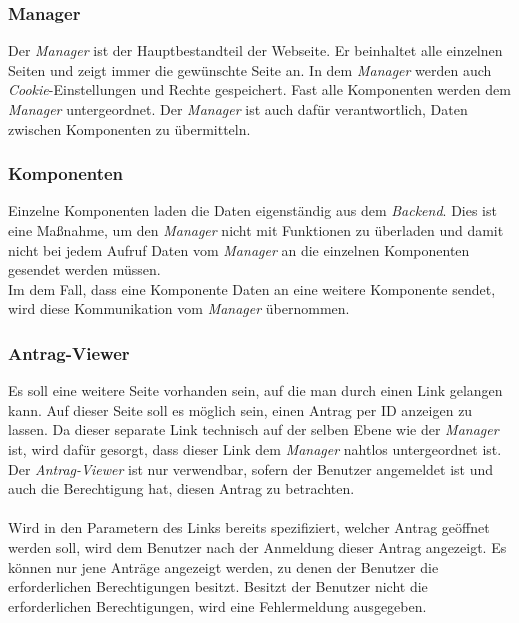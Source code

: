 \subsubsection{Manager}
Der \textit{Manager} ist der Hauptbestandteil der Webseite. Er beinhaltet alle einzelnen Seiten und zeigt immer die gewünschte Seite an. In dem \textit{Manager} werden auch \textit{Cookie}-Einstellungen und Rechte gespeichert. Fast alle Komponenten werden dem \textit{Manager} untergeordnet. Der \textit{Manager} ist auch dafür verantwortlich, Daten zwischen Komponenten zu übermitteln.

\subsubsection{Komponenten}
Einzelne Komponenten laden die Daten eigenständig aus dem \textit{Backend}. Dies ist eine Maßnahme, um den \textit{Manager} nicht mit Funktionen zu überladen und damit nicht bei jedem Aufruf Daten vom \textit{Manager} an die einzelnen Komponenten gesendet werden müssen.\\
Im dem Fall, dass eine Komponente Daten an eine weitere Komponente sendet, wird diese Kommunikation vom \textit{Manager} übernommen.

\subsubsection{Antrag-Viewer}
Es soll eine weitere Seite vorhanden sein, auf die man durch einen Link gelangen kann. Auf dieser Seite soll es möglich sein, einen Antrag per ID anzeigen zu lassen. Da dieser separate Link technisch auf der selben Ebene wie der \textit{Manager} ist, wird dafür gesorgt, dass dieser Link dem \textit{Manager} nahtlos untergeordnet ist. Der \textit{Antrag-Viewer} ist nur verwendbar, sofern der Benutzer angemeldet ist und auch die Berechtigung hat, diesen Antrag zu betrachten.
\\\\
Wird in den Parametern des Links bereits spezifiziert, welcher Antrag geöffnet werden soll, wird dem Benutzer nach der Anmeldung dieser Antrag angezeigt. Es können nur jene Anträge angezeigt werden, zu denen der Benutzer die erforderlichen Berechtigungen besitzt. Besitzt der Benutzer nicht die erforderlichen Berechtigungen, wird eine Fehlermeldung ausgegeben.

